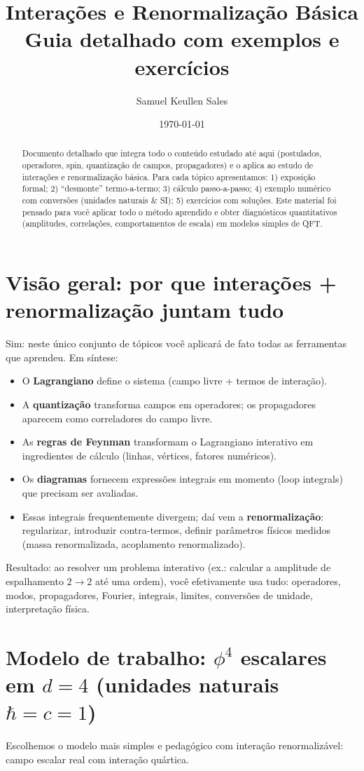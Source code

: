 \documentclass[12pt,a4paper]{article}
\title{Interações e Renormalização Básica\\\small{Guia detalhado com exemplos e exercícios}}
\author{Samuel Keullen Sales}
\date{\today}
\begin{document}
\maketitle

\begin{abstract}
Documento detalhado que integra todo o conteúdo estudado até aqui (postulados, operadores, spin, quantização de campos, propagadores) e o aplica ao estudo de interações e renormalização básica. Para cada tópico apresentamos: 1) exposição formal; 2) ``desmonte'' termo-a-termo; 3) cálculo passo-a-passo; 4) exemplo numérico com conversões (unidades naturais \& SI); 5) exercícios com soluções. Este material foi pensado para você aplicar todo o método aprendido e obter diagnósticos quantitativos (amplitudes, correlações, comportamentos de escala) em modelos simples de QFT.
\end{abstract}

\section{Visão geral: por que interações + renormalização juntam tudo}
Sim: neste único conjunto de tópicos você aplicará de fato todas as ferramentas que aprendeu. Em síntese:
\begin{itemize}
\item O \textbf{Lagrangiano} define o sistema (campo livre + termos de interação).
\item A \textbf{quantização} transforma campos em operadores; os propagadores aparecem como correladores do campo livre.
\item As \textbf{regras de Feynman} transformam o Lagrangiano interativo em ingredientes de cálculo (linhas, vértices, fatores numéricos).
\item Os \textbf{diagramas} fornecem expressões integrais em momento (loop integrals) que precisam ser avaliadas.
\item Essas integrais frequentemente divergem; daí vem a \textbf{renormalização}: regularizar, introduzir contra-termos, definir parâmetros físicos medidos (massa renormalizada, acoplamento renormalizado).
\end{itemize}

Resultado: ao resolver um problema interativo (ex.: calcular a amplitude de espalhamento \(2\to2\) até uma ordem), você efetivamente usa tudo: operadores, modos, propagadores, Fourier, integrais, limites, conversões de unidade, interpretação física.

\section{Modelo de trabalho: \(\phi^4\) escalares em \(d=4\) (unidades naturais \(\hbar=c=1\))}
Escolhemos o modelo mais simples e pedagógico com interação renormalizável: campo escalar real com interação quártica.
\end{document}
